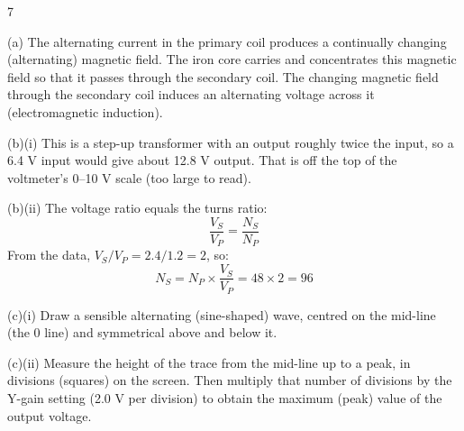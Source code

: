 \begin{question}{7}
\markscheme
{}
\endms

\exemplar
(a) The alternating current in the primary coil produces a continually changing (alternating) magnetic field. The iron core carries and concentrates this magnetic field so that it passes through the secondary coil. The changing magnetic field through the secondary coil induces an alternating voltage across it (electromagnetic induction).

(b)(i) This is a step-up transformer with an output roughly twice the input, so a 6.4 V input would give about 12.8 V output. That is off the top of the voltmeter's 0--10 V scale (too large to read).

(b)(ii) The voltage ratio equals the turns ratio:
$$ \frac{V_S}{V_P} = \frac{N_S}{N_P} $$
From the data, $V_S/V_P = 2.4/1.2 = 2$, so:
$$ N_S = N_P \times \frac{V_S}{V_P} = 48 \times 2 = 96 $$

(c)(i) Draw a sensible alternating (sine-shaped) wave, centred on the mid-line (the 0 line) and symmetrical above and below it.

(c)(ii) Measure the height of the trace from the mid-line up to a peak, in divisions (squares) on the screen. Then multiply that number of divisions by the Y-gain setting (2.0 V per division) to obtain the maximum (peak) value of the output voltage.
\endexemplar
\end{question}

